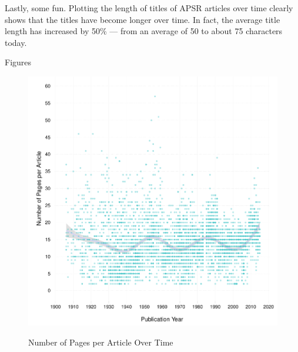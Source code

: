 \documentclass[12pt]{article}
\begin{document}
Lastly, some fun. Plotting the length of titles of APSR articles over time clearly shows that the titles have become longer over time. In fact, the average title length has increased by 50\% --- from an average of 50 to about 75 characters today.

\clearpage
\begin{center}
\large{Figures}
\end{center}

\begin{figure}[htbp]
\centering
\caption{Number of Pages per Article Over Time}
\includegraphics[scale=.85]{../figs/n_pages_per_article_over_time.pdf}
\label{fig:pages}
\end{figure}
\end{document}
